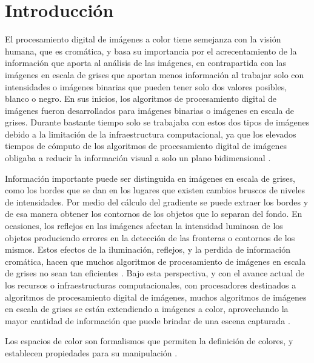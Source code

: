 \section{Introducci\'on}
\label{intro}
El procesamiento digital de im\'agenes a color tiene semejanza \cite{roerdink2000watershed} con la visi\'on humana, que es crom\'atica, y basa su importancia por el acrecentamiento de la informaci\'on que aporta al an\'alisis de las im\'agenes, en contrapartida con las im\'agenes en escala de grises que aportan menos informaci\'on al trabajar solo con intensidades o im\'agenes binarias que pueden tener solo dos valores posibles, blanco o negro. En sus inicios, los algoritmos de procesamiento digital de im\'agenes fueron desarrollados para im\'agenes binarias o im\'agenes en escala de grises. Durante bastante tiempo solo se trabajaba con estos dos tipos de im\'agenes debido a la limitaci\'on de la infraestructura computacional, ya que los elevados tiempos de c\'omputo de los algoritmos de procesamiento digital de im\'agenes obligaba a reducir la informaci\'on visual a solo un plano bidimensional \cite{ortiz2002procesamiento}.

Informaci\'on importante puede ser distinguida en im\'agenes en escala de grises, como los bordes que se dan en los lugares que existen cambios bruscos de niveles de intensidades. Por medio del c\'alculo del gradiente se puede extraer los bordes y de esa manera obtener los contornos de los objetos que lo separan del fondo. En ocasiones, los reflejos en las im\'agenes afectan la intensidad luminosa de los objetos produciendo errores en la detecci\'on de las fronteras o contornos de los mismos. Estos efectos de la iluminaci\'on, reflejos, y la perdida de informaci\'on crom\'atica, hacen que muchos algoritmos de procesamiento de im\'agenes en escala  de grises no sean tan eficientes \cite{ortiz2002procesamiento}. Bajo esta perspectiva, 	y con el avance actual de los recursos o infraestructuras computacionales, con procesadores destinados a algoritmos de procesamiento digital de im\'agenes, muchos algoritmos de im\'agenes en escala de grises se est\'an extendiendo a im\'agenes a color, aprovechando la mayor cantidad de informaci\'on que puede brindar de una escena capturada \cite{ortiz2002procesamiento}.
  
Los espacios de color son formalismos que permiten la definici\'on de colores, y establecen propiedades para su manipulaci\'on \cite{joblove1978color,meyer1980perceptual}.

